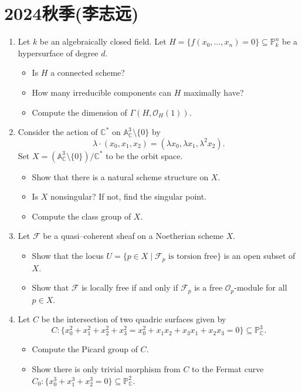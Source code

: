 \section{2024秋季(李志远)}
\begin{enumerate}
		\item Let $k$ be an algebraically closed field. Let $H=\{ f(x_0, \ldots ,x_{n})=0 \}\subseteq \mathbb{P}_{k}^{n}$ be a hypersurface of degree $d$.
			\begin{itemize}
				\item Is $H$ a connected scheme?
				\item How many irreducible components can $H$ maximally have?
				\item Compute the dimension of $\Gamma(H,\mathcal{O}_{H}(1))$.
			\end{itemize}
		
		\item Consider the action of $\mathbb{C}^{*}$ on $\mathbb{A}_{\mathbb{C}}^{3}\setminus \{ 0 \}$ by
			$$
			\lambda\cdot (x_0,x_1,x_2) = (\lambda x_0, \lambda x_1, \lambda^{2}x_2).
			$$
			Set $X=(\mathbb{A}^{3}_{\mathbb{C}}\setminus \{ 0 \})/\mathbb{C}^{*}$ to be the orbit space.
			\begin{itemize}
				\item Show that there is a natural scheme structure on $X$.
				\item Is $X$ nonsingular? If not, find the singular point.
				\item Compute the class group of $X$.
			\end{itemize}

        \item Let $\mathcal{F}$ be a quasi--coherent sheaf on a Noetherian scheme $X$.
			\begin{itemize}
				\item Show that the locus $U=\{ p \in X \mid \mathcal{F}_{p} \text{ is torsion free} \}$ is an open subset of $X$.
				\item Show that $\mathcal{F}$ is locally free if and only if $\mathcal{F}_{p}$ is a free $\mathcal{O}_{p}$-module for all $p \in X$.
			\end{itemize}
		
		\item Let $C$ be the intersection of two quadric surfaces given by
			$$
			C:\{ x_0^{2}+x_1^{2}+x_2^{2}+x_3^{2} = x_0^{2} + x_1 x_2 + x_3 x_1 + x_2 x_3 = 0 \} \subseteq \mathbb{P}_{\mathbb{C}}^{3}.
			$$
			\begin{itemize}
				\item Compute the Picard group of $C$.
				\item Show there is only trivial morphism from $C$ to the Fermat curve $C_0: \{ x_0^{3}+x_1^{3}+x_2^{3} = 0 \}\subseteq \mathbb{P}^{2}_{\mathbb{C}  }$.
			\end{itemize}


\end{enumerate}
